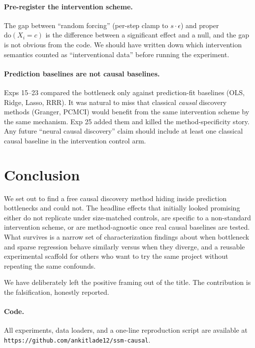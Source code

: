 \documentclass{article}
\begin{document}
\paragraph{Pre-register the intervention scheme.}
The gap between ``random forcing'' (per-step clamp to
$s \cdot \epsilon$) and proper $\text{do}(X_i = c)$ is the
difference between a significant effect and a null, and the gap is
not obvious from the code. We should have written down which
intervention semantics counted as ``interventional data'' before
running the experiment.

\paragraph{Prediction baselines are not causal baselines.}
Exps 15–23 compared the bottleneck only against prediction-fit
baselines (OLS, Ridge, Lasso, RRR). It was natural to miss that
classical \emph{causal} discovery methods (Granger, PCMCI) would
benefit from the same intervention scheme by the same mechanism.
Exp 25 added them and killed the method-specificity story. Any
future ``neural causal discovery'' claim should include at least
one classical causal baseline in the intervention control arm.

\section{Conclusion}

We set out to find a free causal discovery method hiding inside
prediction bottlenecks and could not. The headline effects that
initially looked promising either do not replicate under size-matched
controls, are specific to a non-standard intervention scheme, or are
method-agnostic once real causal baselines are tested. What survives
is a narrow set of characterization findings about when bottleneck
and sparse regression behave similarly versus when they diverge, and
a reusable experimental scaffold for others who want to try the same
project without repeating the same confounds.

We have deliberately left the positive framing out of the title.
The contribution is the falsification, honestly reported.

\paragraph{Code.} All experiments, data loaders, and a one-line
reproduction script are available at
\texttt{https://github.com/ankitlade12/ssm-causal}.



\end{document}
